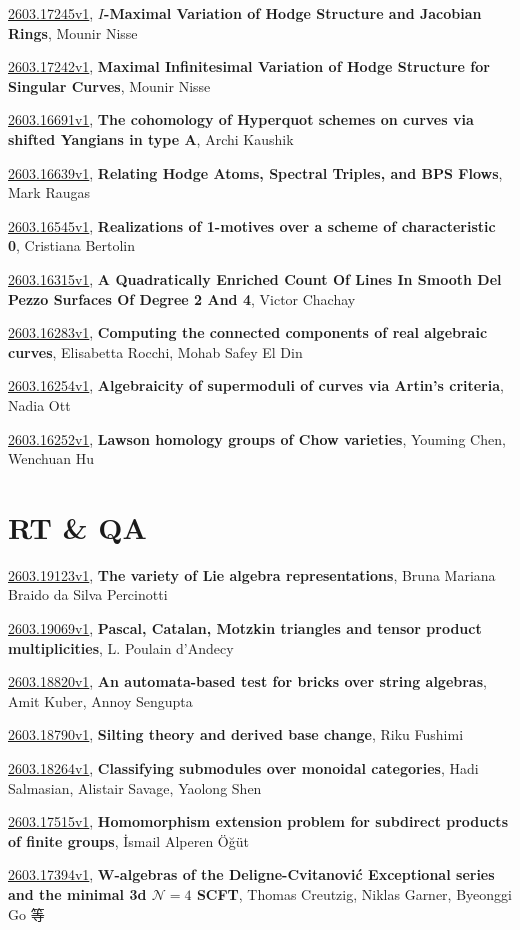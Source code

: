 \documentclass[9pt, a4paper]{article}
\theoremstyle{plain}
\theoremstyle{definition}
\theoremstyle{remark}
\newcommand{\arxiv}[3]{\href{https://arxiv.org/abs/#1}{#1}, \textbf{\textcolor{arxivblue}{#2}}, #3}
\begin{document}
\arxiv{2603.17245v1}{$I$-Maximal Variation of Hodge Structure and Jacobian Rings}{Mounir Nisse}

\arxiv{2603.17242v1}{Maximal Infinitesimal Variation of Hodge Structure for Singular Curves}{Mounir Nisse}

\arxiv{2603.16691v1}{The cohomology of Hyperquot schemes on curves via shifted Yangians in type A}{Archi Kaushik}

\arxiv{2603.16639v1}{Relating Hodge Atoms, Spectral Triples, and BPS Flows}{Mark Raugas}

\arxiv{2603.16545v1}{Realizations of 1-motives over a scheme of characteristic 0}{Cristiana Bertolin}

\arxiv{2603.16315v1}{A Quadratically Enriched Count Of Lines In Smooth Del Pezzo Surfaces Of Degree 2 And 4}{Victor Chachay}

\arxiv{2603.16283v1}{Computing the connected components of real algebraic curves}{Elisabetta Rocchi, Mohab Safey El Din}

\arxiv{2603.16254v1}{Algebraicity of supermoduli of curves via Artin's criteria}{Nadia Ott}

\arxiv{2603.16252v1}{Lawson homology groups of Chow varieties}{Youming Chen, Wenchuan Hu}


\section{RT \& QA}
\arxiv{2603.19123v1}{The variety of Lie algebra representations}{Bruna Mariana Braido da Silva Percinotti}

\arxiv{2603.19069v1}{Pascal, Catalan, Motzkin triangles and tensor product multiplicities}{L. Poulain d'Andecy}

\arxiv{2603.18820v1}{An automata-based test for bricks over string algebras}{Amit Kuber, Annoy Sengupta}

\arxiv{2603.18790v1}{Silting theory and derived base change}{Riku Fushimi}

\arxiv{2603.18264v1}{Classifying submodules over monoidal categories}{Hadi Salmasian, Alistair Savage, Yaolong Shen}

\arxiv{2603.17515v1}{Homomorphism extension problem for subdirect products of finite groups}{İsmail Alperen Öğüt}

\arxiv{2603.17394v1}{W-algebras of the Deligne-Cvitanović Exceptional series and the minimal 3d ${\mathcal N}=4$ SCFT}{Thomas Creutzig, Niklas Garner, Byeonggi Go 等}
\end{document}
